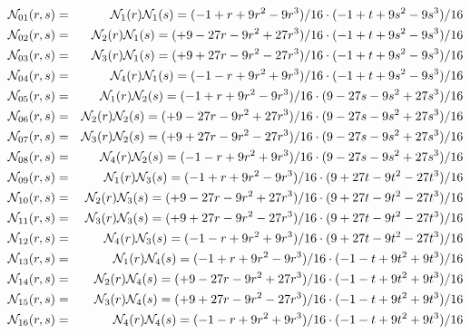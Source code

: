 \begin{mdframed}[backgroundcolor=blue!5]
\begin{eqnarray}
{\mathcal{N}}_{01}(r,s)&=&{\mathcal{N}}_1(r){\mathcal{N}}_1(s) = (-1   +r +9r^2 - 9r^3)/16 \cdot (-1  +t +9s^2 - 9s^3)/16 \nonumber\\
{\mathcal{N}}_{02}(r,s)&=&{\mathcal{N}}_2(r){\mathcal{N}}_1(s) = (+9 -27r -9r^2 +27r^3)/16 \cdot (-1  +t +9s^2 - 9s^3)/16 \nonumber\\
{\mathcal{N}}_{03}(r,s)&=&{\mathcal{N}}_3(r){\mathcal{N}}_1(s) = (+9 +27r -9r^2 -27r^3)/16 \cdot (-1  +t +9s^2 - 9s^3)/16 \nonumber\\
{\mathcal{N}}_{04}(r,s)&=&{\mathcal{N}}_4(r){\mathcal{N}}_1(s) = (-1   -r +9r^2 + 9r^3)/16 \cdot (-1  +t +9s^2 - 9s^3)/16 \nonumber\\
{\mathcal{N}}_{05}(r,s)&=&{\mathcal{N}}_1(r){\mathcal{N}}_2(s) = (-1   +r +9r^2 - 9r^3)/16 \cdot (9 -27s -9s^2 +27s^3)/16 \nonumber\\
{\mathcal{N}}_{06}(r,s)&=&{\mathcal{N}}_2(r){\mathcal{N}}_2(s) = (+9 -27r -9r^2 +27r^3)/16 \cdot (9 -27s -9s^2 +27s^3)/16 \nonumber\\
{\mathcal{N}}_{07}(r,s)&=&{\mathcal{N}}_3(r){\mathcal{N}}_2(s) = (+9 +27r -9r^2 -27r^3)/16 \cdot (9 -27s -9s^2 +27s^3)/16 \nonumber\\
{\mathcal{N}}_{08}(r,s)&=&{\mathcal{N}}_4(r){\mathcal{N}}_2(s) = (-1   -r +9r^2 + 9r^3)/16 \cdot (9 -27s -9s^2 +27s^3)/16 \nonumber\\
{\mathcal{N}}_{09}(r,s)&=&{\mathcal{N}}_1(r){\mathcal{N}}_3(s) = (-1   +r +9r^2 - 9r^3)/16 \cdot (9 +27t -9t^2 -27t^3)/16 \nonumber\\
{\mathcal{N}}_{10}(r,s)&=&{\mathcal{N}}_2(r){\mathcal{N}}_3(s) = (+9 -27r -9r^2 +27r^3)/16 \cdot (9 +27t -9t^2 -27t^3)/16 \nonumber\\
{\mathcal{N}}_{11}(r,s)&=&{\mathcal{N}}_3(r){\mathcal{N}}_3(s) = (+9 +27r -9r^2 -27r^3)/16 \cdot (9 +27t -9t^2 -27t^3)/16 \nonumber\\
{\mathcal{N}}_{12}(r,s)&=&{\mathcal{N}}_4(r){\mathcal{N}}_3(s) = (-1   -r +9r^2 + 9r^3)/16 \cdot (9 +27t -9t^2 -27t^3)/16 \nonumber\\
{\mathcal{N}}_{13}(r,s)&=&{\mathcal{N}}_1(r){\mathcal{N}}_4(s) = (-1   +r +9r^2 - 9r^3)/16 \cdot (-1   -t +9t^2 + 9t^3)/16\nonumber\\
{\mathcal{N}}_{14}(r,s)&=&{\mathcal{N}}_2(r){\mathcal{N}}_4(s) = (+9 -27r -9r^2 +27r^3)/16 \cdot (-1   -t +9t^2 + 9t^3)/16\nonumber\\
{\mathcal{N}}_{15}(r,s)&=&{\mathcal{N}}_3(r){\mathcal{N}}_4(s) = (+9 +27r -9r^2 -27r^3)/16 \cdot (-1   -t +9t^2 + 9t^3)/16\nonumber\\
{\mathcal{N}}_{16}(r,s)&=&{\mathcal{N}}_4(r){\mathcal{N}}_4(s) = (-1   -r +9r^2 + 9r^3)/16 \cdot (-1   -t +9t^2 + 9t^3)/16
\end{eqnarray}
\end{mdframed}

